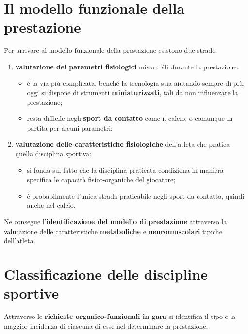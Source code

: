 \section{Il modello funzionale della prestazione}

Per arrivare al modello funzionale della prestazione esistono due strade.

\begin{enumerate}
  \item \textbf{valutazione dei parametri fisiologici} misurabili durante la prestazione:
    \begin{itemize}
      \item è la via più complicata, benché la tecnologia stia aiutando sempre di più: oggi si
        dispone di strumenti \textbf{miniaturizzati}, tali da non influenzare la prestazione;
      \item resta difficile negli \textbf{sport da contatto} come il calcio, o comunque in partita
        per alcuni parametri;
    \end{itemize}
  \item \textbf{valutazione delle caratteristiche fisiologiche} dell'atleta che pratica quella
    disciplina sportiva:
    \begin{itemize}
      \item si fonda sul fatto che la disciplina praticata condiziona in maniera specifica le
        capacità fisico-organiche del giocatore;
      \item è probabilmente l'unica strada praticabile negli sport da contatto, quindi anche nel
        calcio.
    \end{itemize}
\end{enumerate}

Ne consegue l'\textbf{identificazione del modello di prestazione} attraverso la valutazione delle
caratteristiche \textbf{metaboliche} e \textbf{neuromuscolari} tipiche dell'atleta.

\section{Classificazione delle discipline sportive}

Attraverso le \textbf{richieste organico-funzionali in gara} si identifica il tipo e la maggior
incidenza di ciascuna di esse nel determinare la prestazione.

